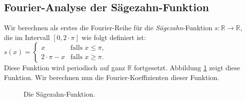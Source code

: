 \subsection{Fourier-Analyse der S\"agezahn-Funktion}
Wir berechnen als erstes die Fourier-Reihe f\"ur die \emph{S\"agezahn}-Funktion $s:\mathbb{R} \rightarrow \mathbb{R}$,  
die im Intervall $[0,2\cdot\pi]$ wie folgt definiert ist:
\\[0.1cm]
\hspace*{1.3cm}
$s(x) = \left\{
\begin{array}{lcl}
    x & \mbox{falls $x \leq \pi$,} \\[0.2cm]
    2\cdot\pi - x & \mbox{falls $x \geq \pi$.}
\end{array}\right.
$
\\[0.1cm]
Diese Funktion wird periodisch auf ganz $\mathbb{R}$ fortgesetzt.
Abbildung \ref{fig:saegezahn.eps} zeigt diese Funktion. Wir berechnen nun die Fourier-Koeffizienten
dieser Funktion.
\begin{figure}[!h]
  \centering
   \caption{Die S\"agezahn-Funktion.}
  \label{fig:saegezahn.eps}
\end{figure}
